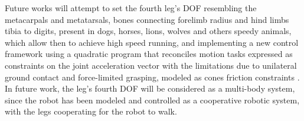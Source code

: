 Future works will attempt to set the fourth leg's DOF resembling the metacarpals and metatarsals, bones connecting forelimb radius and hind limbs tibia to digits, present in dogs, horses, lions, wolves and others speedy animals,  which allow then to achieve high speed running, and implementing a new control framework using a quadratic program that reconciles motion tasks expressed as constraints on the joint acceleration vector \cite{koolen_design_nodate} with the limitations due to unilateral ground contact and force-limited grasping, modeled as cones friction constraints \cite{pratt_bookchapter_2016}.\\  
In future work, the leg's fourth DOF will be considered as a multi-body system\cite{tonetto_musme}, since the robot has been modeled and controlled as a cooperative robotic system, with the legs cooperating for the robot to walk.

